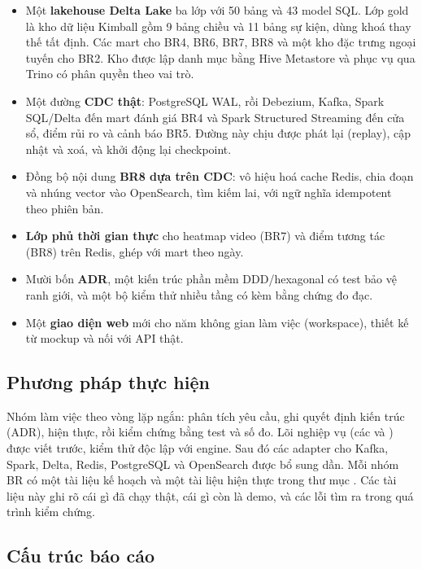 \begin{itemize}
  \item Một \textbf{lakehouse Delta Lake} ba lớp với 50 bảng và 43 model SQL. Lớp gold là kho dữ liệu Kimball gồm 9 bảng chiều và 11 bảng sự kiện, dùng khoá thay thế tất định. Các mart cho BR4, BR6, BR7, BR8 và một kho đặc trưng ngoại tuyến cho BR2. Kho được lập danh mục bằng Hive Metastore và phục vụ qua Trino có phân quyền theo vai trò.
  \item Một đường \textbf{CDC thật}: PostgreSQL WAL, rồi Debezium, Kafka, Spark SQL/Delta đến mart đánh giá BR4 và Spark Structured Streaming đến cửa sổ, điểm rủi ro và cảnh báo BR5. Đường này chịu được phát lại (replay), cập nhật và xoá, và khởi động lại checkpoint.
  \item Đồng bộ nội dung \textbf{BR8 dựa trên CDC}: vô hiệu hoá cache Redis, chia đoạn và nhúng vector vào OpenSearch, tìm kiếm lai, với ngữ nghĩa idempotent theo phiên bản.
  \item \textbf{Lớp phủ thời gian thực} cho heatmap video (BR7) và điểm tương tác (BR8) trên Redis, ghép với mart theo ngày.
  \item Mười bốn \textbf{ADR}, một kiến trúc phần mềm DDD/hexagonal có test bảo vệ ranh giới, và một bộ kiểm thử nhiều tầng có kèm bằng chứng đo đạc.
  \item Một \textbf{giao diện web} mới cho năm không gian làm việc (workspace), thiết kế từ mockup và nối với API thật.
\end{itemize}

\subsection{Phương pháp thực hiện}

Nhóm làm việc theo vòng lặp ngắn: phân tích yêu cầu, ghi quyết định kiến trúc (ADR), hiện thực, rồi kiểm chứng bằng test và số đo. Lõi nghiệp vụ (các  và ) được viết trước, kiểm thử độc lập với engine. Sau đó các adapter cho Kafka, Spark, Delta, Redis, PostgreSQL và OpenSearch được bổ sung dần. Mỗi nhóm BR có một tài liệu kế hoạch và một tài liệu hiện thực trong thư mục . Các tài liệu này ghi rõ cái gì đã chạy thật, cái gì còn là demo, và các lỗi tìm ra trong quá trình kiểm chứng.

\subsection{Cấu trúc báo cáo}

